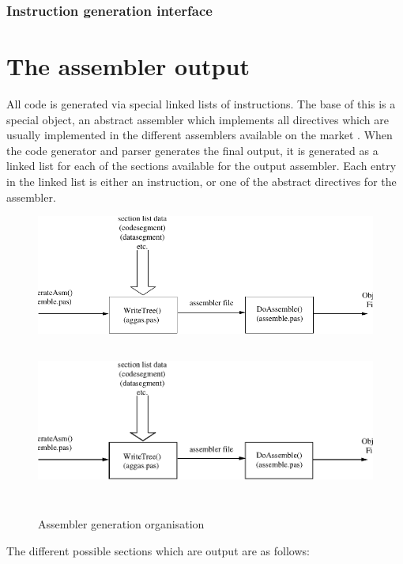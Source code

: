\documentclass [a4paper,12pt]{article}
\begin{document}
\subsubsection{Instruction generation interface}
\label{subsubsec:instruction}

\section{The assembler output}
\label{sec:mylabel8}

All code is generated via special linked lists of instructions. The base of
this is a special object, an abstract assembler which implements all
directives which are usually implemented in the different assemblers
available on the market . When the code generator and parser generates the
final output, it is generated as a linked list for each of the sections
available for the output assembler. Each entry in the linked list is either
an instruction, or one of the abstract directives for the assembler.

\begin{figure}
\ifpdf
\includegraphics{arch11.pdf}
\else
\includegraphics[width=5.67in,height=2.17in]{arch11.eps}
\fi
\label{fig11}
\caption{Assembler generation organisation}
\end{figure}

\clearpage

The different possible sections which are output are as follows:
\end{document}
